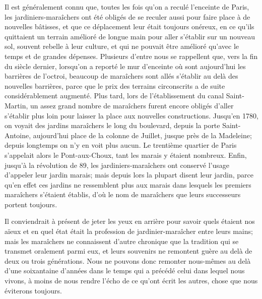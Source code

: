 \documentclass[10pt,a4paper]{book}
\begin{document}
Il est généralement connu que, toutes les fois qu'on a reculé l'enceinte de Paris, les jardiniers-maraîchers ont été obligés de se reculer aussi pour faire place à de nouvelles bâtisses, et que ce déplacement leur était toujours onéreux, en ce qu'ils quittaient un terrain amélioré de longue main pour aller s'établir sur un nouveau sol, souvent rebelle à leur culture, et qui ne pouvait être amélioré qu'avec le temps et de grandes dépenses. Plusieurs d'entre nous se rappellent que, vers la fin du siècle dernier, lorsqu'on a reporté le mur d'enceinte où sont aujourd'hui les barrières de l'octroi, beaucoup de maraîchers sont allés s'établir au delà des nouvelles barrières, parce que le prix des terrains circonscrits a de suite considérablement augmenté. Plus tard, lors de l'établissement du canal Saint-Martin, un assez grand nombre de maraîchers furent encore obligés d'aller s'établir plus loin pour laisser la place aux nouvelles constructions. Jusqu'en 1780, on voyait des jardins maraîchers le long du boulevard, depuis la porte Saint-Antoine, aujourd'hui place de la colonne de Juillet, jusque près de la Madeleine; depuis longtemps on n'y en voit plus aucun. Le trentième quartier de Paris s'appelait alors le Pont-aux-Choux, tant les marais y étaient nombreux. Enfin, jusqu'à la révolution de 89, les jardiniers-maraîchers ont conservé l'usage d'appeler leur jardin marais; mais depuis lors la plupart disent leur jardin, parce qu'en effet ces jardins ne ressemblent plus aux marais dans lesquels les premiers maraîchers s'étaient établis, d'où le nom de maraîchers que leurs successeurs portent toujours.

Il conviendrait à présent de jeter les yeux en arrière pour savoir quels étaient nos aïeux et en quel état était la profession de jardinier-maraîcher entre leurs mains; mais les maraîchers ne connaissent d'autre chronique que la tradition qui se transmet oralement parmi eux, et leurs souvenirs ne remontent guère au delà de deux ou trois générations. Nous ne pouvons donc remonter nous-mêmes au delà d'une soixantaine d'années dans le temps qui a précédé celui dans lequel nous vivons, à moins de nous rendre l'écho de ce qu'ont écrit les autres, chose que nous éviterons toujours.
\end{document}
